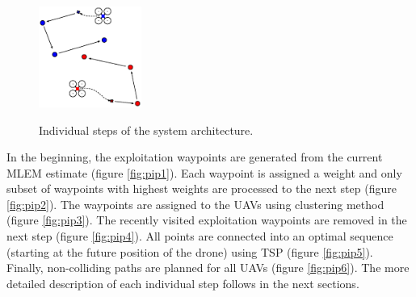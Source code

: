 \begin{figure}[!htb]
{    \includegraphics[width=0.3\textwidth]{./fig/photos/pip5.eps}
    \label{fig:pip5}
  }
  \caption{Individual steps of the system architecture.}
  \label{fig:pipeline}
\end{figure}%

In the beginning, the exploitation waypoints are generated from the current \ac{MLEM} estimate (figure \ref{fig:pip1}).
Each waypoint is assigned a weight and only subset of waypoints with highest weights are processed to the next step (figure \ref{fig:pip2}).
The waypoints are assigned to the \ac{UAV}s using clustering method (figure \ref{fig:pip3}).
The recently visited exploitation waypoints are removed in the next step (figure \ref{fig:pip4}).
All points are connected into an optimal sequence (starting at the future position of the drone) using TSP (figure \ref{fig:pip5}).
Finally, non-colliding paths are planned for all \ac{UAV}s (figure \ref{fig:pip6}).
The more detailed description of each individual step follows in the next sections.


